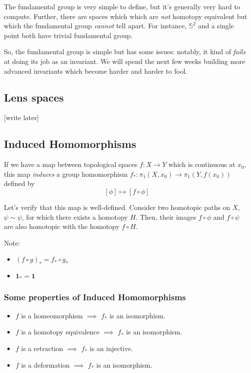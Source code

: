 \documentclass{article}
\begin{document}
\vskip 0.5cm
The fundamental group is very simple to define, but it's generally very hard to compute. Further, there are spaces which which are \emph{not} homotopy equivalent but which the fundamental group \emph{cannot} tell apart. For instance, $\mathbb{S}^2$ and a single point both have trivial fundamental group.

\vskip 0.5cm
So, the fundamental group is simple but has some issues: notably, it kind of \emph{fails} at doing its job as an invariant. We will spend the next few weeks building more advanced invariants which become harder and harder to fool.

\vskip 0.5cm
\subsection{Lens spaces}

[write later]

\vskip 0.5cm
\subsection{Induced Homomorphisms}
If we have a map between topological spaces $f : X \rightarrow Y$ which is continuous at $x_0$, this map \emph{induces} a group homomorphism $f_* : \pi_1(X, x_0) \rightarrow \pi_1(Y, f(x_0))$ defined by 
\[ [\phi] \mapsto [f \circ \phi] \]

Let's verify that this map is well-defined. Consider two homotopic paths on $X$, $\psi \sim \psi$, for which there exists a homotopy $H$. Then, their images $f \circ \phi$ and $f \circ \psi$ are also homotopic with the homotopy $f \circ H$.

\begin{dottedbox}
  Note: 
  \begin{itemize}
    \item $(f \circ g)_{*} = f_* \circ g_*$ 
    \item $\mathbf{1}_* = \mathbf{1}$
  \end{itemize}
\end{dottedbox}

\subsubsection*{Some properties of Induced Homomorphisms}

\begin{itemize}
  \item $f$ is a homeomorphism $\implies$ $f_*$ is an isomorphism.
  \item $f$ is a homotopy equivalence $\implies$ $f_*$ is an isomorphism.
  \item $f$ is a retraction $\implies$ $f_*$ is an injective.
  \item $f$ is a deformation $\implies$ $f_*$ is an isomorphism.
\end{itemize}
\end{document}
